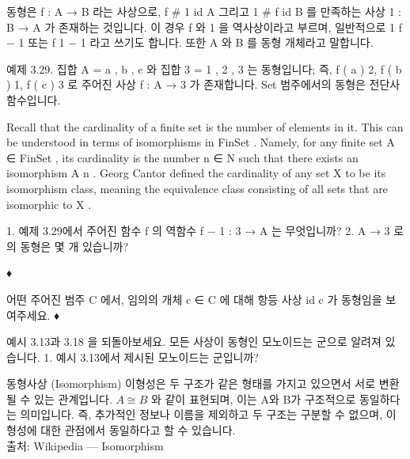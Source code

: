 \documentclass[11pt, a4paper, twoside, openany]{book}
\begin{document}
{\par\medskip
\begin{definitionbox}[정의 3.28.]
동형은 f : A → B 라는 사상으로, f \# 1  id A 그리고 1 \# f  id B 를 만족하는 사상 1 : B → A 가 존재하는 것입니다. 이 경우 f 와 1 을 역사상이라고 부르며, 일반적으로 1  f − 1 또는 f  1 − 1 라고 쓰기도 합니다. 또한 A 와 B 를 동형 개체라고 말합니다.
\end{definitionbox}

\par\medskip
예제 3.29. 집합 A = { a , b , c } 와 집합 3 = { 1 , 2 , 3 } 는 동형입니다; 즉, f ( a )  2, f ( b )  1, f ( c )  3 로 주어진 사상 f : A → 3 가 존재합니다. Set 범주에서의 동형은 전단사 함수입니다.

\par\medskip
Recall that the cardinality of a finite set is the number of elements in it. This can be understood in terms of isomorphisms in FinSet . Namely, for any finite set A ∈ FinSet , its cardinality is the number n ∈ N such that there exists an isomorphism A  n . Georg Cantor defined the cardinality of any set X to be its isomorphism class, meaning the equivalence class consisting of all sets that are isomorphic to X .

\par\medskip
\begin{exercisebox}[연습문제 3.30.]
1. 예제 3.29\hspace{0pt}에서 주어진 함수 f 의 역함수 f − 1 : 3 → A 는 무엇입니까?
2. A → 3 로의 동형은 몇 개 있습니까?
\end{exercisebox}

\par\medskip
♦

\par\medskip
\begin{exercisebox}[연습문제 3.31.]
어떤 주어진 범주 C 에서, 임의의 개체 c ∈ C 에 대해 항등 사상 id c 가 동형임을 보여주세요.
♦
\end{exercisebox}

\par\medskip
\begin{exercisebox}[연습문제 3.32.]
예시 3.13\hspace{0pt}과 3.18 을 되돌아보세요. 모든 사상이 동형인 모노이드는 군으로 알려져 있습니다.
1. 예시 3.13\hspace{0pt}에서 제시된 모노이드는 군입니까?
\end{exercisebox}


\begin{deepresearch}{동형사상 (Isomorphism)}
이형성은 두 구조가 같은 형태를 가지고 있으면서 서로 변환될 수 있는 관계입니다.  $A \cong B$ 와 같이 표현되며, 이는 A\hspace{0pt}와 B\hspace{0pt}가 구조적으로 동일하다는 의미입니다. 즉, 추가적인 정보나 이름을 제외하고 두 구조는 구분할 수 없으며, 이형성에 대한 관점에서 동일하다고 할 수 있습니다.
\\[4pt]{\footnotesize\color{ctgray} 출처: Wikipedia — Isomorphism}
\end{deepresearch}

}
\end{document}
